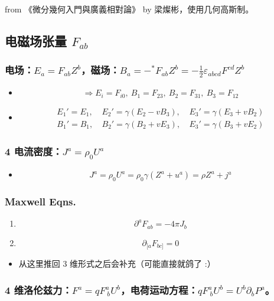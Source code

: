 \documentclass{article}
\begin{document}
from 《微分幾何入門與廣義相對論》 by 梁燦彬，使用几何高斯制。

\subsection{电磁场张量 $F_{ab}$}

\subsubsection{电场：$E_{a}=F_{ab}Z^b$，磁场：$B_a=-^*F_{ab}Z^b=-\frac{1}{2}\varepsilon_{abcd}F^{cd}Z^b$}

\begin{itemize}
    \item $$\Rightarrow E_{i}=F_{i0},\ B_{1}=F_{23},\ B_{2}=F_{31},\ B_{3}=F_{12}$$
    \item $$\begin{aligned}
                  E_1'=E_1,\  & E_2'=\gamma(E_2-vB_3),\  & E_3'=\gamma(E_3+vB_2) \\
                  B_1'=B_1,\  & B_2'=\gamma(B_2+vE_3),\  & E_3'=\gamma(B_3+vE_2)
              \end{aligned}$$
\end{itemize}

\subsubsection{4 电流密度：$J^a=\rho_0U^a$}

\begin{itemize}
    \item $$J^a=\rho_0U^a=\rho_0\gamma(Z^a+u^a)=\rho Z^a+j^a$$
\end{itemize}

\subsubsection{Maxwell Eqns.}

\begin{enumerate}
    \item $$\partial^aF_{ab}=-4\pi J_b$$
    \item $$\partial_{[a}F_{bc]}=0$$
\end{enumerate}

\begin{itemize}
    \item 从这里推回 3 维形式之后会补充（可能直接就鸽了 :）
\end{itemize}

\subsubsection{4 维洛伦兹力：$F^a=qF^a_{\ b}U^b$，电荷运动方程：$qF^a_{\ b}U^b=U^b\partial_b P^a$。}
\end{document}
